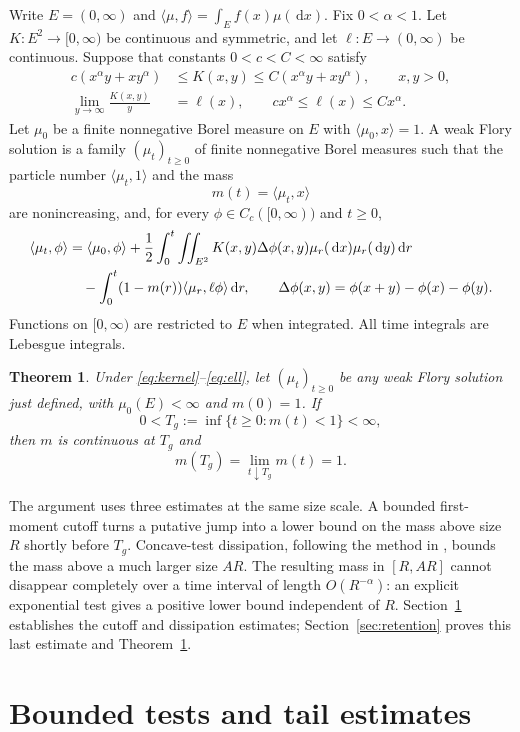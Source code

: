 \documentclass[11pt]{article}
\newtheorem{theorem}{Theorem}
\newcommand{\Rplus}{(0,\infty)}
\newcommand{\pair}[2]{\langle #1,#2\rangle}
\newcommand{\dd}{\,\mathrm{d}}
\begin{document}
Write $E=\Rplus$ and $\pair{\mu}{f}=\int_E f(x)\mu(\dd x)$. Fix $0<\alpha<1$. Let $K:E^2\to[0,\infty)$ be continuous and symmetric, and let $\ell:E\to(0,\infty)$ be continuous. Suppose that constants $0<c<C<\infty$ satisfy
\begin{align}
 c(x^\alpha y+xy^\alpha)&\le K(x,y)\le C(x^\alpha y+xy^\alpha),\qquad x,y>0,\label{eq:kernel}\\
 \lim_{y\to\infty}\frac{K(x,y)}y&=\ell(x),\qquad
 cx^\alpha\le\ell(x)\le Cx^\alpha.\label{eq:ell}
\end{align}
Let $\mu_0$ be a finite nonnegative Borel measure on $E$ with $\pair{\mu_0}{x}=1$. A weak Flory solution is a family $(\mu_t)_{t\ge0}$ of finite nonnegative Borel measures such that the particle number $\pair{\mu_t}{1}$ and the mass
\[
 m(t)=\pair{\mu_t}{x}
\]
are nonincreasing, and, for every $\phi\in C_c([0,\infty))$ and $t\ge0$,
\begin{align}
 \pair{\mu_t}{\phi}
 &=\pair{\mu_0}{\phi}
 +\frac12\int_0^t\iint_{E^2}K(x,y)\Delta\phi(x,y)\mu_r(\dd x)\mu_r(\dd y)\dd r\notag\\
 &\quad-\int_0^t(1-m(r))\pair{\mu_r}{\ell\phi}\dd r,
 \qquad \Delta\phi(x,y)=\phi(x+y)-\phi(x)-\phi(y).
 \label{eq:flory}
\end{align}
Functions on $[0,\infty)$ are restricted to $E$ when integrated. All time integrals are Lebesgue integrals.

\begin{theorem}\label{thm:main}
Under \eqref{eq:kernel}--\eqref{eq:ell}, let $(\mu_t)_{t\ge0}$ be any weak Flory solution just defined, with $\mu_0(E)<\infty$ and $m(0)=1$. If
\[
 0<T_g:=\inf\{t\ge0:m(t)<1\}<\infty,
\]
then $m$ is continuous at $T_g$ and
\[
 m(T_g)=\lim_{t\downarrow T_g}m(t)=1.
\]
\end{theorem}

The argument uses three estimates at the same size scale. A bounded first-moment cutoff turns a putative jump into a lower bound on the mass above size $R$ shortly before $T_g$. Concave-test dissipation, following the method in \cite[proof of Proposition~2.3]{FL}, bounds the mass above a much larger size $AR$. The resulting mass in $[R,AR]$ cannot disappear completely over a time interval of length $O(R^{-\alpha})$: an explicit exponential test gives a positive lower bound independent of $R$. Section~\ref{sec:estimates} establishes the cutoff and dissipation estimates; Section~\ref{sec:retention} proves this last estimate and Theorem~\ref{thm:main}.

\section{Bounded tests and tail estimates}\label{sec:estimates}
\end{document}
